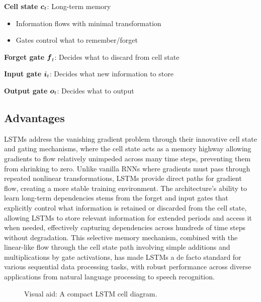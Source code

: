 \textbf{Cell state} $\boldsymbol{c}_t$: Long-term memory
\begin{itemize}
    \item Information flows with minimal transformation
    \item Gates control what to remember/forget
\end{itemize}

\textbf{Forget gate} $\boldsymbol{f}_t$: Decides what to discard from cell state

\textbf{Input gate} $\boldsymbol{i}_t$: Decides what new information to store

\textbf{Output gate} $\boldsymbol{o}_t$: Decides what to output

\subsection{Advantages}

LSTMs address the vanishing gradient problem through their innovative cell state and gating mechanisms, where the cell state acts as a memory highway allowing gradients to flow relatively unimpeded across many time steps, preventing them from shrinking to zero. Unlike vanilla RNNs where gradients must pass through repeated nonlinear transformations, LSTMs provide direct paths for gradient flow, creating a more stable training environment. The architecture's ability to learn long-term dependencies stems from the forget and input gates that explicitly control what information is retained or discarded from the cell state, allowing LSTMs to store relevant information for extended periods and access it when needed, effectively capturing dependencies across hundreds of time steps without degradation. This selective memory mechanism, combined with the linear-like flow through the cell state path involving simple additions and multiplications by gate activations, has made LSTMs a de facto standard for various sequential data processing tasks, with robust performance across diverse applications from natural language processing to speech recognition.

\begin{figure}[h]
    \centering
    \caption{Visual aid: A compact LSTM cell diagram.}
    \label{fig:lstm_cell_diagram}
\end{figure}

